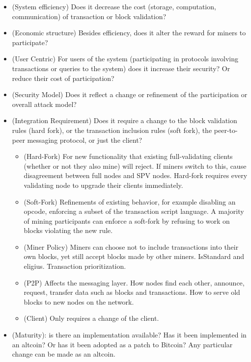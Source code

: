 \begin{itemize}
\item (System efficiency) Does it decrease the cost (storage, computation, communication) of transaction or block validation?
\item (Economic structure) Besides efficiency, does it alter the reward for miners to participate?
\item (User Centric) For users of the system (participating in protocols involving transactions or queries to the system) does it increase their security? Or reduce their cost of participation?
\item (Security Model) Does it reflect a change or refinement of the participation or overall attack model?
\item (Integration Requirement) Does it require a change to the block validation rules (hard fork), or the transaction inclusion rules (soft fork), the peer-to-peer messaging protocol, or just the client?
  \begin{itemize}
    \item (Hard-Fork) For new functionality that existing full-validating clients (whether or not they also mine) will reject. If miners switch to this, cause disagreement between full nodes and SPV nodes. Hard-fork requires every validating node to upgrade their clients immediately.
    \item (Soft-Fork) Refinements of existing behavior, for example disabling an opcode, enforcing a subset of the transaction script language. A majority of mining participants can enforce a soft-fork by refusing to work on blocks violating the new rule.
    \item (Miner Policy) Miners can choose not to include transactions into their own blocks, yet still accept blocks made by other miners. IsStandard and eligius. Transaction prioritization.
    \item (P2P) Affects the messaging layer. How nodes find each other, announce, request, transfer data such as blocks and transactions. How to serve old blocks to new nodes on the network.
    \item (Client) Only requires a change of the client.
  \end{itemize}
\item (Maturity): is there an implementation available? Has it been implemented in an altcoin? Or has it been adopted as a patch to Bitcoin? Any particular change can be made as an altcoin.
\end{itemize}

